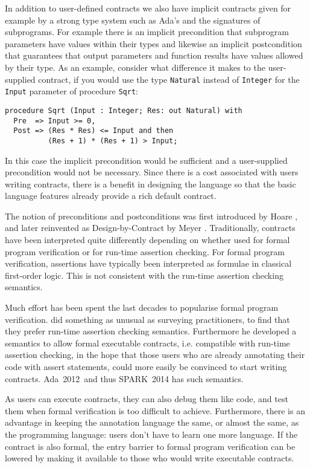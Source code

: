 \documentclass[sttt,draft]{svjour}
\newcommand{\newspark}{SPARK~2014\xspace}
\newcommand{\adatwtw}{Ada~2012\xspace}
\begin{document}
In addition to user-defined contracts we also have implicit contracts
given for example by a strong type system such as Ada's and the
signatures of subprograms. For example there is an implicit
precondition that subprogram parameters have values within their types
and likewise an implicit postcondition that guarantees that output
parameters and function results have values allowed by their type. As
an example, consider what difference it makes to the user-supplied
contract, if you would use the type \verb|Natural| instead of
\verb|Integer| for the \verb|Input| parameter of procedure \verb|Sqrt|:

\begin{footnotesize}
\begin{verbatim}
procedure Sqrt (Input : Integer; Res: out Natural) with
  Pre  => Input >= 0,
  Post => (Res * Res) <= Input and then
          (Res + 1) * (Res + 1) > Input;
\end{verbatim}
\end{footnotesize}
In this case the implicit precondition would be sufficient and a
user-supplied precondition would not be necessary. Since there is a
cost associated with users writing contracts, there is a benefit in
designing the language so that the basic language features already
provide a rich default contract.

The notion of preconditions and postconditions was first introduced by Hoare
\cite{hoare69cacm}, and later reinvented as Design-by-Contract by Meyer
\cite{meyer:1988:OSC}. Traditionally, contracts have been interpreted quite
differently depending on whether used for formal program verification or for
run-time assertion checking. For formal program verification, assertions have
typically been interpreted as formulae in classical first-order logic. This is
not consistent with the run-time assertion checking semantics.

Much effort has been spent the last decades to popularise formal
program verification. \cite{tseChalin10} did something as unusual as
surveying practitioners, to find that they prefer run-time assertion
checking semantics. Furthermore he developed a semantics to allow
formal executable contracts, i.e. compatible with run-time assertion
checking, in the hope that those users who are already annotating
their code with assert statements, could more easily be convinced to
start writing contracts. \adatwtw\ and thus \newspark has such
semantics.

As users can execute contracts, they can also debug them like code, and test
them when formal verification is too difficult to achieve.
Furthermore, there is an advantage in keeping the annotation language
the same, or almost the same, as the programming language: users
don't have to learn one more language. If the contract is also formal,
the entry barrier to formal program verification can be lowered by
making it available to those who would write executable contracts.
\end{document}

